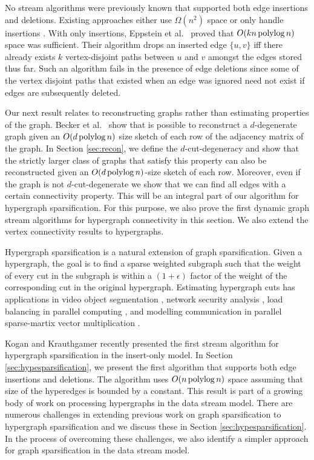 No stream algorithms were previously known that supported both edge insertions and deletions. Existing approaches either use $\Omega(n^2)$ space \cite{Sankowski07} or only handle insertions \cite{EppsteinGIN97}. With only insertions, Eppstein et al.~\cite{EppsteinGIN97} proved that $O(kn \operatorname{polylog} n)$ space was sufficient. Their algorithm drops an inserted edge $\{u,v\}$ iff there already exists $k$ vertex-disjoint paths between $u$ and $v$ amongst the edges stored thus far. Such an algorithm fails in the presence of edge deletions since some of the vertex disjoint paths that existed when an edge was ignored need not exist if edges are subsequently deleted.

 Our next result relates to reconstructing graphs rather than estimating properties of the graph. Becker et al.~\cite{BeckerMNRST11} show that is possible to reconstruct a $d$-degenerate graph given an $O(d \operatorname{polylog} n)$ size sketch of each row of the adjacency matrix of the graph. In Section \ref{sec:recon}, we define the  $d$-cut-degeneracy and show that the strictly larger class of graphs that satisfy this property can also be reconstructed given an $O(d \operatorname{polylog} n)$-size sketch of each row. Moreover, even if the graph is not $d$-cut-degenerate we show that we can find all edges with a certain connectivity property. This will be an integral part of our algorithm for hypergraph sparsification. For this purpose, we also prove the first dynamic graph stream algorithms for hypergraph connectivity in this section. We also extend the vertex connectivity results to hypergraphs.


Hypergraph sparsification is a natural extension of graph sparsification. Given a hypergraph, the goal is to find a sparse weighted subgraph such that the weight of every cut in the subgraph is within a $(1+\epsilon)$ factor of the weight of the corresponding cut in the original hypergraph. 
Estimating hypergraph cuts has applications in video object segmentation \cite{HuangLM09}, network security analysis \cite{Yamaguchi14},  load balancing in parallel computing \cite{CatalyurekBDBHR09}, and
modelling communication in parallel sparse-martix vector multiplication 
\cite{CatalyurekA99}.

Kogan and Krauthgamer \cite{KoganK14} recently presented the first stream algorithm for hypergraph sparsification in the insert-only model. In Section \ref{sec:hypesparsification}, we present the first algorithm that supports both edge insertions and deletions. The algorithm uses $O(n\operatorname{polylog} n)$ space assuming that size of the hyperedges is bounded by a  constant. This result is part of a growing body of work on processing hypergraphs in the data stream model\cite{SahaG09,EmekR14,RadhakrishnanS11,Sun13,KoganK14}. There are numerous challenges in extending previous work on graph sparsification \cite{AhnGM12b,AhnGM13,KapralovLMMS14,KapralovW14,GoelKP12} to hypergraph sparsification and we discuss these in Section \ref{sec:hypesparsification}. In the process of overcoming these challenges, we also identify a simpler approach for graph sparsification in the data stream model.

